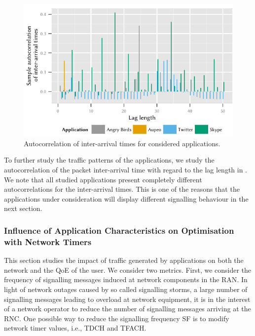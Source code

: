 \begin{figure}
\centering
\includegraphics{network/network_traces/numerical_results/figures/autocorrelation}
\caption{Autocorrelation of inter-arrival times for considered applications.}\label{fig:network:network_traces:numerical_results:traffic:autocorrelation}
\end{figure}

To further study the traffic patterns of the applications, we study the autocorrelation of the packet inter-arrival time with regard to the lag length in .
We note that all studied applications present completely different autocorrelations for the inter-arrival times.
This is one of the reasons that the applications under consideration will display different signalling behaviour in the next section.

\subsubsection*{Influence of Application Characteristics on Optimisation with Network Timers}\label{sec:network:network_traces:numerical_results:application_influence}
This section studies the impact of traffic generated by applications on both the network and the
\gls{QoE} of the user.
We consider two metrics.
First, we consider the frequency of signalling messages induced at network components in the \gls{RAN}.
In light of network outages caused by so called signalling storms, a large number of signalling messages leading to overload at network equipment, it is in the interest of a network operator to reduce the number of signalling messages arriving at the \gls{RNC}.
One possible way to reduce the signalling frequency \gls{SF} is to modify network timer values, i.e., \gls{TDCH} and \gls{TFACH}.

